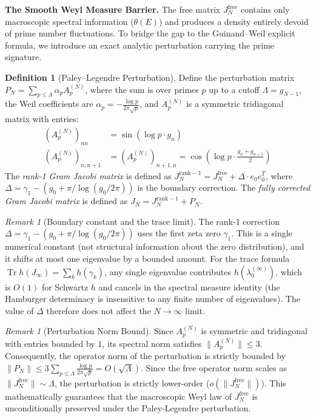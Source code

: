 \documentclass{pre-aomart}
\theoremstyle{plain}
\theoremstyle{definition}
\newtheorem{definition}[theorem]{Definition}
\theoremstyle{remark}
\newtheorem{remark}[theorem]{Remark}
\begin{document}
\textbf{The Smooth Weyl Measure Barrier.} The free matrix $J_N^{\mathrm{free}}$ contains only macroscopic spectral information ($\theta(E)$) and produces a density entirely devoid of prime number fluctuations. To bridge the gap to the Guinand--Weil explicit formula, we introduce an exact analytic perturbation carrying the prime signature.

\begin{definition}[Paley--Legendre Perturbation]\label{def:P_N}
Define the perturbation matrix $P_N = \sum_{p \le \Lambda} \alpha_p A_p^{(N)}$, where the sum is over primes $p$ up to a cutoff $\Lambda = g_{N-1}$, the Weil coefficients are $\alpha_p = -\frac{\log p}{2\pi\sqrt{p}}$, and $A_p^{(N)}$ is a symmetric tridiagonal matrix with entries:
\begin{align*}
(A_p^{(N)})_{nn} &= \sin(\log p \cdot g_n) \\
(A_p^{(N)})_{n,n+1} &= (A_p^{(N)})_{n+1,n} = \cos\left(\log p \cdot \frac{g_n + g_{n+1}}{2}\right)
\end{align*}
The \emph{rank-1 Gram Jacobi matrix} is defined as $J_N^{\mathrm{rank-1}} = J_N^{\mathrm{free}} + \Delta \cdot e_0 e_0^T$, where $\Delta = \gamma_1 - (g_0 + \pi/\log(g_0/2\pi))$ is the boundary correction.
The \emph{fully corrected Gram Jacobi matrix} is defined as $J_N = J_N^{\mathrm{rank-1}} + P_N$.
\end{definition}

\begin{remark}[Boundary constant and the trace limit]\label{rem:delta_const}
The rank-1 correction $\Delta = \gamma_1 - (g_0 + \pi/\log(g_0/2\pi))$ uses the
first zeta zero $\gamma_1$.  This is a single numerical constant (not
structural information about the zero distribution), and it shifts at most
one eigenvalue by a bounded amount.  For the trace formula
$\operatorname{Tr} h(J_\infty) = \sum_k h(\gamma_k)$, any single
eigenvalue contributes $h(\lambda_0^{(\infty)})$, which is $O(1)$ for
Schwartz $h$ and cancels in the spectral measure identity
(the Hamburger determinacy is insensitive to any finite number of
eigenvalues).  The value of $\Delta$ therefore does not affect the
$N \to \infty$ limit.
\end{remark}

\begin{remark}[Perturbation Norm Bound]
Since $A_p^{(N)}$ is symmetric and tridiagonal with entries bounded by $1$, its spectral norm satisfies $\|A_p^{(N)}\| \le 3$. Consequently, the operator norm of the perturbation is strictly bounded by $\|P_N\| \le 3 \sum_{p \le \Lambda} \frac{\log p}{2\pi\sqrt{p}} = O(\sqrt{\Lambda})$. Since the free operator norm scales as $\|J_N^{\mathrm{free}}\| \sim \Lambda$, the perturbation is strictly lower-order ($o(\|J_N^{\mathrm{free}}\|)$). This mathematically guarantees that the macroscopic Weyl law of $J_N^{\mathrm{free}}$ is unconditionally preserved under the Paley-Legendre perturbation.
\end{remark}
\end{document}
